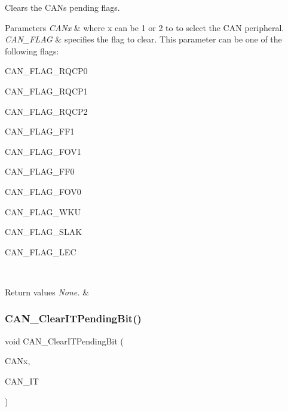 Clears the C\+AN\textquotesingle{}s pending flags. 


\begin{DoxyParams}{Parameters}
{\em C\+A\+Nx} & where x can be 1 or 2 to to select the C\+AN peripheral. \\
\hline
{\em C\+A\+N\+\_\+\+F\+L\+AG} & specifies the flag to clear. This parameter can be one of the following flags\+:
\begin{DoxyItemize}
\item C\+A\+N\+\_\+\+F\+L\+A\+G\+\_\+\+R\+Q\+C\+P0
\item C\+A\+N\+\_\+\+F\+L\+A\+G\+\_\+\+R\+Q\+C\+P1
\item C\+A\+N\+\_\+\+F\+L\+A\+G\+\_\+\+R\+Q\+C\+P2
\item C\+A\+N\+\_\+\+F\+L\+A\+G\+\_\+\+F\+F1
\item C\+A\+N\+\_\+\+F\+L\+A\+G\+\_\+\+F\+O\+V1
\item C\+A\+N\+\_\+\+F\+L\+A\+G\+\_\+\+F\+F0
\item C\+A\+N\+\_\+\+F\+L\+A\+G\+\_\+\+F\+O\+V0
\item C\+A\+N\+\_\+\+F\+L\+A\+G\+\_\+\+W\+KU
\item C\+A\+N\+\_\+\+F\+L\+A\+G\+\_\+\+S\+L\+AK
\item C\+A\+N\+\_\+\+F\+L\+A\+G\+\_\+\+L\+EC
\end{DoxyItemize}\\
\hline
\end{DoxyParams}

\begin{DoxyRetVals}{Return values}
{\em None.} & \\
\hline
\end{DoxyRetVals}
\mbox{\label{group___c_a_n___exported___functions_ga30bf7ac0c1793f6622a4a1adbb7dbc8a}} 
\subsubsection{\texorpdfstring{CAN\_ClearITPendingBit()}{CAN\_ClearITPendingBit()}}
{\footnotesize\ttfamily void C\+A\+N\+\_\+\+Clear\+I\+T\+Pending\+Bit (\begin{DoxyParamCaption}\item[{\mbox{\hyperlink{struct_c_a_n___type_def}{C\+A\+N\+\_\+\+Type\+Def}} $\ast$}]{C\+A\+Nx,  }\item[{uint32\+\_\+t}]{C\+A\+N\+\_\+\+IT }\end{DoxyParamCaption})}



